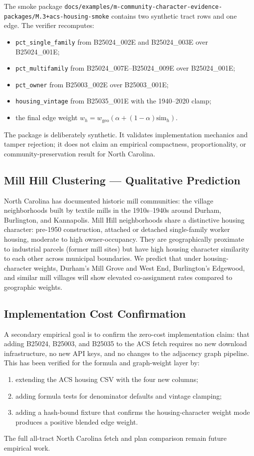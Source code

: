 The smoke package
\texttt{docs/examples/m-community-character-evidence-packages/M.3+acs-housing-smoke}
contains two synthetic tract rows and one edge. The verifier recomputes:
\begin{itemize}
  \item \texttt{pct\_single\_family} from B25024\_002E and B25024\_003E over
    B25024\_001E;
  \item \texttt{pct\_multifamily} from B25024\_007E--B25024\_009E over
    B25024\_001E;
  \item \texttt{pct\_owner} from B25003\_002E over B25003\_001E;
  \item \texttt{housing\_vintage} from B25035\_001E with the 1940--2020 clamp;
  \item the final edge weight
    $w_h = w_{\mathrm{geo}}(\alpha + (1-\alpha)\mathrm{sim}_h)$.
\end{itemize}
The package is deliberately synthetic. It validates implementation mechanics
and tamper rejection; it does not claim an empirical compactness,
proportionality, or community-preservation result for North Carolina.

\subsection{Mill Hill Clustering --- Qualitative Prediction}

North Carolina has documented historic mill communities: the village neighborhoods
built by textile mills in the 1910s--1940s around Durham, Burlington, and
Kannapolis.
Mill Hill neighborhoods share a distinctive housing character: pre-1950
construction, attached or detached single-family worker housing, moderate
to high owner-occupancy.
They are geographically proximate to industrial parcels (former mill sites)
but have high housing character similarity to each other across municipal
boundaries.
We predict that under housing-character weights, Durham's Mill Grove and
West End, Burlington's Edgewood, and similar mill villages will show elevated
co-assignment rates compared to geographic weights.

\subsection{Implementation Cost Confirmation}

A secondary empirical goal is to confirm the zero-cost implementation claim:
that adding B25024, B25003, and B25035 to the ACS fetch requires no new
download infrastructure, no new API keys, and no changes to the adjacency
graph pipeline.
This has been verified for the formula and graph-weight layer by:
\begin{enumerate}
  \item extending the ACS housing CSV with the four new columns;
  \item adding formula tests for denominator defaults and vintage clamping;
  \item adding a hash-bound fixture that confirms the housing-character weight
    mode produces a positive blended edge weight.
\end{enumerate}
The full all-tract North Carolina fetch and plan comparison remain future
empirical work.


